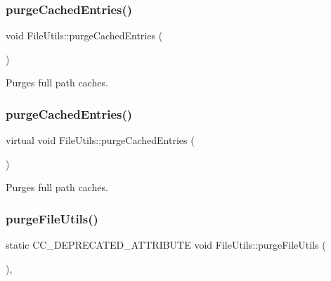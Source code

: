 \subsubsection{\texorpdfstring{purge\+Cached\+Entries()}{purgeCachedEntries()}\hspace{0.1cm}{\footnotesize\ttfamily [1/2]}}
{\footnotesize\ttfamily void File\+Utils\+::purge\+Cached\+Entries (\begin{DoxyParamCaption}{ }\end{DoxyParamCaption})\hspace{0.3cm}{\ttfamily [virtual]}}

Purges full path caches. \mbox{\label{classFileUtils_a344792c0707b0089493f7b39f2ad57d9}} 
\subsubsection{\texorpdfstring{purge\+Cached\+Entries()}{purgeCachedEntries()}\hspace{0.1cm}{\footnotesize\ttfamily [2/2]}}
{\footnotesize\ttfamily virtual void File\+Utils\+::purge\+Cached\+Entries (\begin{DoxyParamCaption}{ }\end{DoxyParamCaption})\hspace{0.3cm}{\ttfamily [virtual]}}

Purges full path caches. \mbox{\label{classFileUtils_ac420e697b4b0c1a3c5e9711dcaa66c31}} 
\subsubsection{\texorpdfstring{purge\+File\+Utils()}{purgeFileUtils()}\hspace{0.1cm}{\footnotesize\ttfamily [1/2]}}
{\footnotesize\ttfamily static C\+C\+\_\+\+D\+E\+P\+R\+E\+C\+A\+T\+E\+D\+\_\+\+A\+T\+T\+R\+I\+B\+U\+TE void File\+Utils\+::purge\+File\+Utils (\begin{DoxyParamCaption}{ }\end{DoxyParamCaption})\hspace{0.3cm}{\ttfamily [inline]}, {\ttfamily [static]}}

